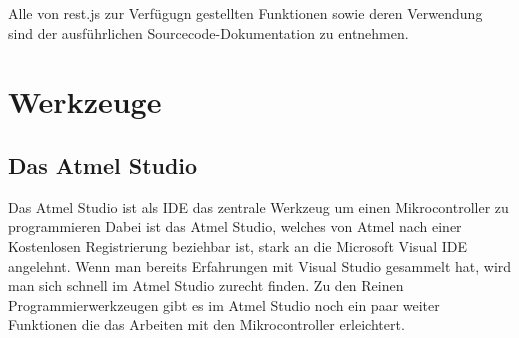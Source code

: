 Alle von \textrm{rest.js} zur Verfügugn gestellten Funktionen sowie deren
Verwendung sind der ausführlichen Sourcecode-Dokumentation zu entnehmen.


\section{Werkzeuge}

\subsection{Das Atmel Studio}

Das Atmel Studio ist als \ac{IDE} das zentrale Werkzeug um einen Mikrocontroller
zu programmieren Dabei ist das Atmel Studio, welches von Atmel nach einer
Kostenlosen Registrierung beziehbar ist, stark an die Microsoft Visual \ac{IDE}
angelehnt. Wenn man bereits Erfahrungen mit Visual Studio gesammelt hat, wird
man sich schnell im Atmel Studio zurecht finden. Zu den Reinen
Programmierwerkzeugen gibt es im Atmel Studio noch ein paar weiter Funktionen
die das Arbeiten mit den Mikrocontroller erleichtert.


